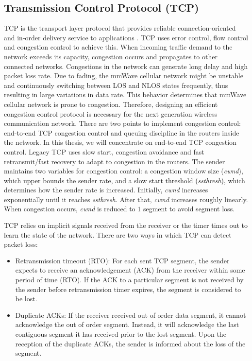 \subsection{Transmission Control Protocol (TCP)}
\label{subsec:3}
\par TCP is the transport layer protocol that provides reliable connection-oriented and in-order delivery service to applications \cite{panwar2004tcp}. TCP uses error control, flow control and congestion control to achieve this. When incoming traffic demand to the network exceeds its capacity, congestion occurs and propagates to other connected networks. Congestions in the network can generate long delay and high packet loss rate. Due to fading, the mmWave cellular network might be unstable and continuously switching between LOS and NLOS states frequently, thus resulting in large variations in data rate. This behavior determines that mmWave cellular network is prone to congestion. Therefore, designing an efficient congestion control protocol is necessary for the next generation wireless communication network. There are two points to implement congestion control: end-to-end TCP congestion control and queuing discipline in the routers inside the network. In this thesis, we will concentrate on end-to-end TCP congestion control. Legacy TCP uses slow start, congestion avoidance and fast retransmit/fast recovery to adapt to congestion in the routers. The sender maintains two variables for congestion control: a congestion window size (\emph{cwnd}), which upper bounds the sender rate, and a slow start threshold (\emph{ssthresh}), which determines how the sender rate is increased. Initially, \emph{cwnd} increases exponentially until it reaches \emph{ssthresh}. After that, \emph{cwnd} increases roughly linearly. When congestion occurs, \emph{cwnd} is reduced to $1$ segment to avoid segment loss. 
\par TCP relies on implicit signals received from the receiver or the timer times out to learn the state of the network. There are two ways in which TCP can detect packet loss: 
\begin{itemize}
\item Retransmission timeout (RTO): For each sent TCP segment, the sender expects to receive an acknowledgement (ACK) from the receiver within some period of time (RTO). If the ACK to a particular segment is not received by the sender before retransmission timer expires, the segment is considered to be lost. 
\item Duplicate ACKs: If the receiver received out of order data segment, it cannot acknowledge the out of order segment. Instead, it will acknowledge the last contiguous segment it has received prior to the lost segment. Upon the reception of the duplicate ACKs, the sender is informed about the loss of the segment.
\end{itemize}
